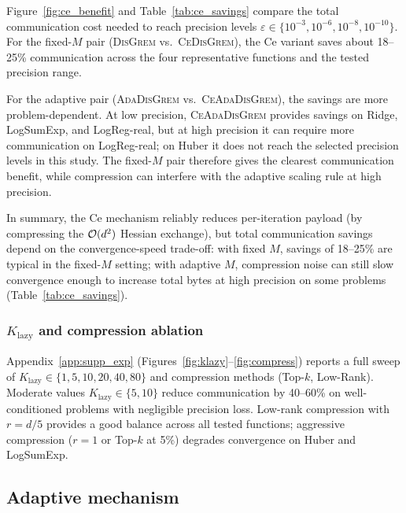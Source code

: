 \documentclass[review,onefignum,onetabnum]{siamart171218}
\begin{document}
	Figure~\ref{fig:ce_benefit} and Table~\ref{tab:ce_savings} compare
	the total communication cost needed to reach precision levels $\varepsilon\in\{10^{-3},10^{-6},10^{-8},10^{-10}\}$.
	For the fixed-$M$ pair (\textsc{DisGrem} vs.\ \textsc{CeDisGrem}), the Ce variant
	saves about 18--25\% communication across the four representative
	functions and the tested precision range.
	
	For the adaptive pair (\textsc{AdaDisGrem} vs.\ \textsc{CeAdaDisGrem}),
	the savings are more problem-dependent.
	At low precision, \textsc{CeAdaDisGrem} provides savings on Ridge,
	LogSumExp, and LogReg-real, but at high precision it can require more
	communication on LogReg-real; on Huber it does not reach the selected
	precision levels in this study.
	The fixed-$M$ pair therefore gives the clearest communication benefit,
	while compression can interfere with the adaptive scaling rule at high
	precision.
	
	In summary, the Ce mechanism reliably reduces
	per-iteration payload (by compressing the $\mathcal{O}(d^2)$
	Hessian exchange), but total communication savings depend on
	the convergence-speed trade-off: with fixed $M$, savings of
	18--25\% are typical in the fixed-$M$ setting; with adaptive $M$,
	compression noise can still slow convergence enough to increase
	total bytes at high precision on some problems
	(Table~\ref{tab:ce_savings}).
	
	\subsubsection{\texorpdfstring{$K_{\mathrm{lazy}}$}{K-lazy} and compression ablation}
	
	Appendix~\ref{app:supp_exp} (Figures~\ref{fig:klazy}--\ref{fig:compress})
	reports a full sweep of $K_{\mathrm{lazy}}\in\{1,5,10,20,40,80\}$
	and compression methods (Top-$k$, Low-Rank).
	Moderate values $K_{\mathrm{lazy}}\in\{5,10\}$ reduce
	communication by 40--60\% on well-conditioned problems with
	negligible precision loss.
	Low-rank compression with $r{=}d/5$ provides a good balance
	across all tested functions; aggressive compression ($r{=}1$ or
	Top-$k$ at 5\%) degrades convergence on Huber and LogSumExp.
	
	\FloatBarrier
	\subsection{Adaptive mechanism}\label{ssec:ada}
	
\end{document}
